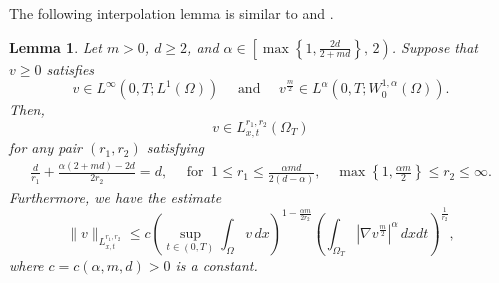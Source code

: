 \documentclass{amsart}
\newtheorem{lemma}[defn]{Lemma}
\numberwithin{equation}{section}
\begin{document}
The following interpolation lemma is similar to \cite[Lemma~3.4]{HKK02} and \cite[Proposition~3.3]{DB93}.

\begin{lemma}\label{L:V}
	Let $m>0$, $d\geq 2$, and $\alpha \in \left[ \max\left\{1, \frac{2d}{2+md}\right\}, \, 2 \right)$. Suppose that $v\geq 0$ satisfies 
	\[
	v \in L^{\infty}(0, T; L^1 (\Omega)) \quad \text{ and } \quad
	v^{\frac{m}{2}} \in L^{\alpha} (0, T; W_{0}^{1, \alpha}(\Omega)).
	\]
	Then, 
	\[
	v \in L^{r_1, r_2}_{x,t}(\Omega_{T})
	\]
	for any pair $(r_1, r_2)$ satisfying
	\begin{equation}\label{Lr1r2}
	\begin{aligned}
	\frac{d}{r_1} + \frac{ \alpha (2+ md) - 2d}{2r_2} = d, \quad 
	\text{ for } \ 1 \leq r_1 \leq \frac{\alpha md}{2(d-\alpha)}, \quad  \max\left\{1, \frac{\alpha m}{2}\right\}\leq r_2 \leq \infty.
	\end{aligned}
	\end{equation}
	Furthermore, we have the estimate
	\begin{equation}\label{Lr1r2_norm}
	\|v\|_{L^{r_1, r_2}_{x,t}} \leq c\left(\sup_{t\in(0,T)} \int_{\Omega} v \,dx\right)^{1-\frac{\alpha m}{2r_2}} \left(\int_{\Omega_T} \left|\nabla v^{\frac{m}{2}}\right|^{\alpha}\,dxdt\right)^{\frac{1}{r_2}},
	\end{equation}
	where $c=c(\alpha, m, d)>0$ is a constant.
\end{lemma}
\end{document}
